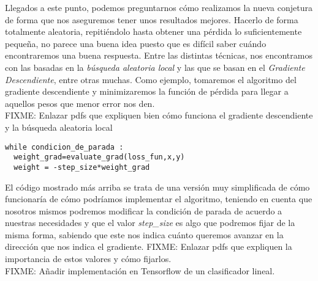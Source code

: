 Llegados a este punto, podemos preguntarnos cómo realizamos la nueva conjetura de forma que nos aseguremos tener unos resultados mejores. Hacerlo de forma totalmente aleatoria, repitiéndolo hasta obtener una pérdida lo suficientemente pequeña, no parece una buena idea puesto que es difícil saber cuándo encontraremos una buena respuesta. Entre las distintas técnicas, nos encontramos con las basadas en la \emph{búsqueda aleatoria local} y las que se basan en el \emph{Gradiente Descendiente}, entre otras muchas. Como ejemplo, tomaremos el algoritmo del gradiente descendiente y minimizaremos la función de pérdida para llegar a aquellos pesos que menor error nos den.\\

FIXME: Enlazar pdfs que expliquen bien cómo funciona el gradiente descendiente y la búsqueda aleatoria local \\
\lstset{language=Python}
\begin{lstlisting}[frame=single]
while condicion_de_parada :
  weight_grad=evaluate_grad(loss_fun,x,y)
  weight = -step_size*weight_grad

\end{lstlisting}

El código mostrado más arriba se trata de una versión muy simplificada de cómo funcionaría de cómo podríamos implementar el algoritmo, teniendo en cuenta que nosotros mismos podremos modificar la condición de parada de acuerdo a nuestras necesidades y que el valor \emph{step\_size} es algo que podremos fijar de la misma forma, sabiendo que este nos indica cuánto queremos avanzar en la dirección que nos indica el gradiente. FIXME: Enlazar pdfs que expliquen la importancia de estos valores y cómo fijarlos.\\

FIXME: Añadir implementación en Tensorflow de un clasificador lineal.


